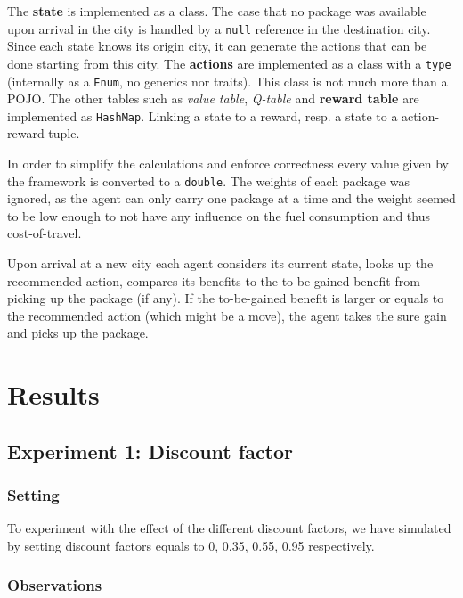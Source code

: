 \documentclass[11pt]{article}
\begin{document}
The \textbf{state} is implemented as a class. The case that no package was available upon arrival in the city is handled by a \texttt{null} reference in the destination city. Since each state knows its origin city, it can generate the actions that can be done starting from this city.
The \textbf{actions} are implemented as a class with a \texttt{type} (internally as a \texttt{Enum}, no generics nor traits). This class is not much more than a POJO.
The other tables such as \textit{value table}, \textit{Q-table} and \textbf{reward table} are implemented as \texttt{HashMap}. Linking a state to a reward, resp. a state to a action-reward tuple.

In order to simplify the calculations and enforce correctness every value given by the framework is converted to a \texttt{double}. The weights of each package was ignored, as the agent can only carry one package at a time and the weight seemed to be low enough to not have any influence on the fuel consumption and thus cost-of-travel.

Upon arrival at a new city each agent considers its current state, looks up the recommended action, compares its benefits to the to-be-gained benefit from picking up the package (if any). If the to-be-gained benefit is larger or equals to the recommended action (which might be a move), the agent takes the sure gain and picks up the package.

\section{Results}

\subsection{Experiment 1: Discount factor}

\subsubsection{Setting}
To experiment with the effect of the different discount factors, we have simulated by setting discount factors equals to 0, 0.35, 0.55, 0.95 respectively.

\subsubsection{Observations}
\end{document}
